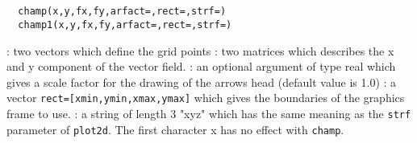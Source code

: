 \begin{mandesc}
  \\ %
  \\ %
\end{mandesc}
\begin{calling_sequence}
\begin{verbatim}
  champ(x,y,fx,fy,arfact=,rect=,strf=)
  champ1(x,y,fx,fy,arfact=,rect=,strf=)
\end{verbatim}
\end{calling_sequence}
\begin{parameters}
  \begin{varlist}
    : two vectors which define the grid points
    : two matrices which describes the x and y component of the vector field.
    : an optional argument of type real which gives a scale factor
    for the drawing of the arrows head (default value is 1.0)
    : a vector \verb!rect=[xmin,ymin,xmax,ymax]! which gives
    the boundaries of the graphics frame to use.
    : a string of length 3 "xyz" which has the same meaning as the
    \verb!strf! parameter of \verb!plot2d!. The first
    character x has no effect with \verb!champ!.
  \end{varlist}
\end{parameters}

